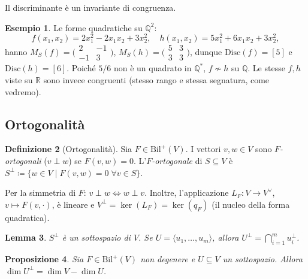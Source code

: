 \documentclass[11pt, a4paper]{book}
\theoremstyle{definition}
\newtheorem{definizione}{Definizione}[section]
\newtheorem{esempio}[definizione]{Esempio}
\theoremstyle{plain}
\newtheorem{proposizione}[definizione]{Proposizione}
\newtheorem{lemma}[definizione]{Lemma}
\theoremstyle{remark}
\newcommand{\Q}{\mathbb{Q}}
\newcommand{\R}{\mathbb{R}}
\begin{document}
Il discriminante è un invariante di congruenza.

\begin{exbox}
\begin{esempio}
Le forme quadratiche su $\Q^2$:
\[
  f(x_1,x_2) = 2x_1^2-2x_1x_2+3x_2^2, \quad h(x_1,x_2) = 5x_1^2+6x_1x_2+3x_2^2,
\]
hanno $M_S(f) = \bigl(\begin{smallmatrix}2&-1\\-1&3\end{smallmatrix}\bigr)$, $M_S(h) = \bigl(\begin{smallmatrix}5&3\\3&3\end{smallmatrix}\bigr)$, dunque $\mathrm{Disc}(f) = [5]$ e $\mathrm{Disc}(h) = [6]$. Poiché $5/6$ non è un quadrato in $\Q^*$, $f \not\sim h$ su $\Q$. Le stesse $f, h$ viste su $\R$ sono invece congruenti (stesso rango e stessa segnatura, come vedremo).
\end{esempio}
\end{exbox}

\subsection{Ortogonalit\`a}

\begin{defbox}
\begin{definizione}[Ortogonalit\`a]
\label{def:ortogonalita-F}
Sia $F \in \mathrm{Bil}^+(V)$. I vettori $v,w\in V$ sono \emph{$F$-ortogonali} ($v \perp w$) se $F(v,w)=0$. L'\emph{$F$-ortogonale} di $S \subseteq V$ è $S^\perp \coloneqq \{w \in V \mid F(v,w)=0\;\forall v\in S\}$.
\end{definizione}
\end{defbox}

Per la simmetria di $F$: $v\perp w \Leftrightarrow w \perp v$. Inoltre, l'applicazione $L_F \colon V \to V^\vee$, $v \mapsto F(v,\cdot)$, è lineare e $V^\perp = \ker(L_F) = \ker(q_F)$ (il nucleo della forma quadratica).

\begin{lemma}
\label{lem:ortogonale-sottospazio}
$S^\perp$ è un sottospazio di $V$. Se $U = \langle u_1,\ldots,u_m\rangle$, allora $U^\perp = \bigcap_{i=1}^m u_i^\perp$.
\end{lemma}

\begin{proposizione}
\label{prop:dim-ortogonale}
Sia $F \in \mathrm{Bil}^+(V)$ non degenere e $U \subseteq V$ un sottospazio. Allora $\dim U^\perp = \dim V - \dim U$.
\end{proposizione}
\end{document}
